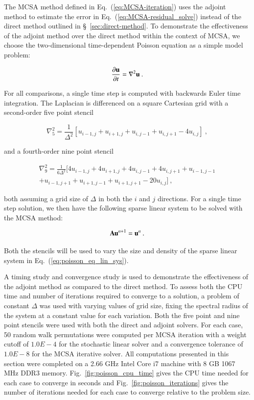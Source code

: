 \documentclass[preprint,12pt]{elsarticle}
\newcommand{\vA}{\ensuremath{\ve{A}}}
\newcommand{\vu}{\ensuremath{\ve{u}}}
\begin{document}
The MCSA method defined in Eq.~(\ref{eq:MCSA-iteration}) uses the
adjoint method to estimate the error in
Eq.~(\ref{eq:MCSA-residual_solve}) instead of the direct method
outlined in \S~\ref{sec:direct-method}. To demonstrate the
effectiveness of the adjoint method over the direct method within the
context of MCSA, we choose the two-dimensional time-dependent Poisson
equation as a simple model problem:

\begin{equation}
  \frac{\partial \vu}{\partial t} = \nabla^2 \vu\:.
  \label{eq:poisson_equation}
\end{equation}

For all comparisons, a single time step is computed with backwards
Euler time integration. The Laplacian is differenced on a square
Cartesian grid with a second-order five point stencil

\begin{equation}
  \nabla^2_5 = \frac{1}{\Delta^2}[u_{i-1,j} + u_{i+1,j} + u_{i,j-1} +
    u_{i,j+1} - 4 u_{i,j}]\:,
  \label{eq:five_point_stencil}
\end{equation}

and a fourth-order nine point stencil 

\begin{multline}
  \nabla^2_9 = \frac{1}{6\Delta^2}[4 u_{i-1,j} + 4 u_{i+1,j} + 4
    u_{i,j-1} + 4 u_{i,j+1} + u_{i-1,j-1}\\ + u_{i-1,j+1} +
    u_{i+1,j-1} + u_{i+1,j+1} - 20 u_{i,j}]\:,
  \label{eq:nine_point_stencil}
\end{multline}

both assuming a grid size of $\Delta$ in both the $i$ and $j$
directions. For a single time step solution, we then have the
following sparse linear system to be solved with the MCSA method:

\begin{equation}
  \vA \vu^{n+1} = \vu^n\:.
  \label{eq:poisson_eq_lin_sys}
\end{equation}

Both the stencils will be used to vary the size and density of the
sparse linear system in Eq.~(\ref{eq:poisson_eq_lin_sys}).

A timing study and convergence study is used to demonstrate the
effectiveness of the adjoint method as compared to the direct
method. To assess both the CPU time and number of iterations required
to converge to a solution, a problem of constant $\Delta$ was used
with varying values of grid size, fixing the spectral radius of the
system at a constant value for each variation. Both the five point and
nine point stencils were used with both the direct and adjoint
solvers. For each case, 50 random walk permutations were computed per
MCSA iteration with a weight cutoff of $1.0E-4$ for the stochastic
linear solver and a convergence tolerance of $1.0E-8$ for the MCSA
iterative solver. All computations presented in this section were
completed on a 2.66 GHz Intel Core i7 machine with 8 GB 1067 MHz DDR3
memory. Fig.~\ref{fig:poisson_cpu_time} gives the CPU time needed for
each case to converge in seconds and Fig.~\ref{fig:poisson_iterations}
gives the number of iterations needed for each case to converge
relative to the problem size.
\end{document}
